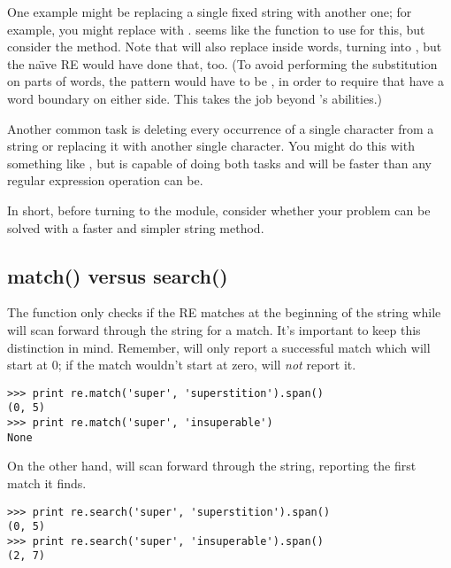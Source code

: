 \documentclass{howto}
\begin{document}
One example might be replacing a single fixed string with another
one; for example, you might replace 
with .   seems like the function to use for
this, but consider the  method.  Note that 
 will also replace  inside
words, turning  into , but the 
na{\"\i}ve RE  would have done that, too.  (To avoid performing
the substitution on parts of words, the pattern would have to be
, in order to require that  have a
word boundary on either side.  This takes the job beyond 
's abilities.)

Another common task is deleting every occurrence of a single character
from a string or replacing it with another single character.  You
might do this with something like , but
 is capable of doing both tasks
and will be faster than any regular expression operation can be.

In short, before turning to the  module, consider whether
your problem can be solved with a faster and simpler string method.

\subsection{match() versus search()}

The  function only checks if the RE matches at
the beginning of the string while  will scan
forward through the string for a match.
It's important to keep this distinction in mind.  Remember, 
 will only report a successful match which
will start at 0; if the match wouldn't start at zero, 
 will \emph{not} report it.

\begin{verbatim}
>>> print re.match('super', 'superstition').span()  
(0, 5)
>>> print re.match('super', 'insuperable')    
None
\end{verbatim}

On the other hand,  will scan forward through the
string, reporting the first match it finds.

\begin{verbatim}
>>> print re.search('super', 'superstition').span()
(0, 5)
>>> print re.search('super', 'insuperable').span()
(2, 7)
\end{verbatim}
\end{document}
